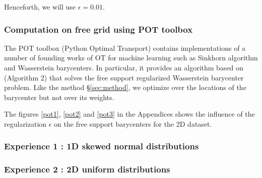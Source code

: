 Henceforth, we will use $\epsilon = 0.01$. 

\subsubsection{Computation on free grid using POT toolbox}

The POT toolbox (Python Optimal Transport) \cite{flamary_pot_2021} contains implementations of a number of founding works of OT for machine learning such as Sinkhorn algorithm and Wasserstein barycenters. In particular, it provides an algorithm based on \cite{cuturi_fast_2014} (Algorithm 2) that solves the free support regularized Wasserstein barycenter problem. Like the method \S\ref{sec:method}, we optimize over the locations of the barycenter but not over its weights. 

The figures \ref{pot1}, \ref{pot2} and \ref{pot3} in the Appendices shows the influence of the regularization $\epsilon$ on the free support barycenters for the 2D dataset.

\subsubsection{Experience 1 : 1D skewed normal distributions}

\subsubsection{Experience 2 : 2D uniform distributions}

